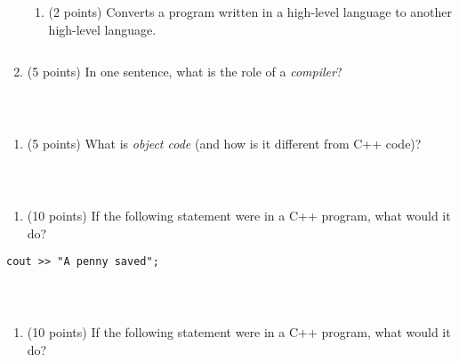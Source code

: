 \begin{enumerate}
\begin{verbatim}
\end{verbatim}

  \begin{enumerate}
  \def\labelenumii{\alph{enumii}.}
  \setcounter{enumii}{4}
  \tightlist
  \item
    (2 points) Converts a program written in a high-level language to
    another high-level language.
  \end{enumerate}

\begin{verbatim}

\end{verbatim}
\item
  (5 points) In one sentence, what is the role of a \emph{compiler}?
\end{enumerate}

\begin{verbatim}



\end{verbatim}

\begin{enumerate}
\def\labelenumi{\arabic{enumi}.}
\setcounter{enumi}{8}
\tightlist
\item
  (5 points) What is \emph{object code} (and how is it different from
  C++ code)?
\end{enumerate}

\begin{verbatim}



\end{verbatim}

\begin{enumerate}
\def\labelenumi{\arabic{enumi}.}
\setcounter{enumi}{9}
\tightlist
\item
  (10 points) If the following statement were in a C++ program, what
  would it do?
\end{enumerate}

\begin{verbatim}
cout >> "A penny saved";
\end{verbatim}

\begin{verbatim}



\end{verbatim}

\begin{enumerate}
\def\labelenumi{\arabic{enumi}.}
\setcounter{enumi}{10}
\tightlist
\item
  (10 points) If the following statement were in a C++ program, what
  would it do?
\end{enumerate}

